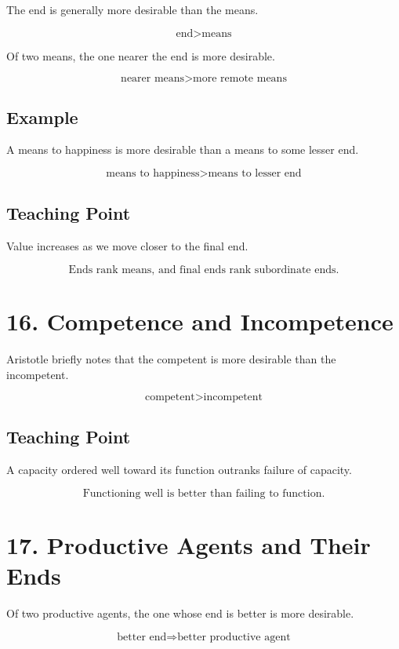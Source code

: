 \documentclass[12pt]{article}
\begin{document}
The end is generally more desirable than the means.

\[
\text{end} > \text{means}
\]

Of two means, the one nearer the end is more desirable.

\[
\text{nearer means} > \text{more remote means}
\]

\subsection*{Example}

A means to happiness is more desirable than a means to some lesser end.

\[
\text{means to happiness} > \text{means to lesser end}
\]

\subsection*{Teaching Point}

Value increases as we move closer to the final end.

\[
\boxed{
\text{Ends rank means, and final ends rank subordinate ends.}
}
\]

\section*{16. Competence and Incompetence}

Aristotle briefly notes that the competent is more desirable than the
incompetent.

\[
\text{competent} > \text{incompetent}
\]

\subsection*{Teaching Point}

A capacity ordered well toward its function outranks failure of capacity.

\[
\boxed{
\text{Functioning well is better than failing to function.}
}
\]

\section*{17. Productive Agents and Their Ends}

Of two productive agents, the one whose end is better is more desirable.

\[
\text{better end} \Rightarrow \text{better productive agent}
\]
\end{document}

